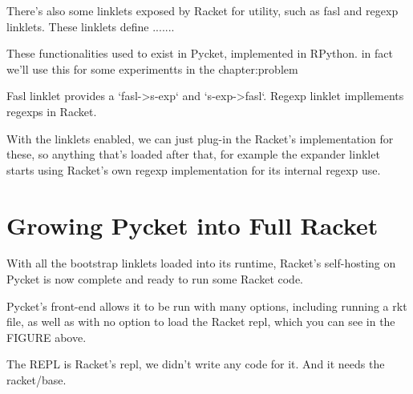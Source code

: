			\begin{paragraph-here}%
				There's also some linklets exposed by Racket for utility, such as fasl and regexp linklets. These linklets define .......
			\end{paragraph-here}

			\begin{paragraph-here}%
				These functionalities used to exist in Pycket, implemented in RPython. in fact we'll use this for some experimentts in the chapter:problem
			\end{paragraph-here}

			\begin{paragraph-here}%
				Fasl linklet provides a `fasl->s-exp` and `s-exp->fasl`. Regexp linklet impllements regexps in Racket.
			\end{paragraph-here}

			\begin{paragraph-here}%
				With the linklets enabled, we can just plug-in the Racket's implementation for these, so anything that's loaded after that, for example the expander linklet starts using Racket's own regexp implementation for its internal regexp use.
			\end{paragraph-here}

	\section[\texorpdfstring{Growing Pycket into Full Racket}{Pycket as Full Racket}]{Growing Pycket into Full Racket}


		\begin{paragraph-here}%
			With all the bootstrap linklets loaded into its runtime, Racket's self-hosting on Pycket is now complete and ready to run some Racket code.
		\end{paragraph-here}

		\begin{paragraph-here}%
			Pycket's front-end allows it to be run with many options, including running a rkt file, as well as with no option to load the Racket repl, which you can see in the FIGURE above.
		\end{paragraph-here}

		\begin{paragraph-here}%
			The REPL is Racket's repl, we didn't write any code for it. And it needs the racket/base.
		\end{paragraph-here}

